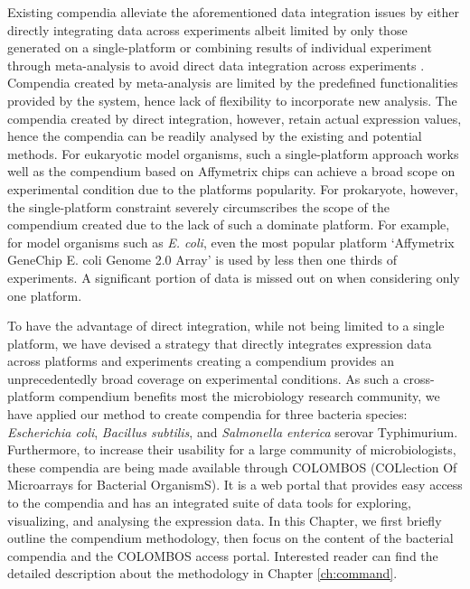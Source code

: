 Existing compendia alleviate the aforementioned data integration issues by 
either directly integrating data across experiments albeit limited by only 
those generated on a single-platform \cite{Faith2008, Hruz2008} 
or combining results of individual experiment through meta-analysis to avoid 
direct data integration across experiments 
\cite{Rhodes2007, Pan2007, Elfilali2006, Kapushesky2010}.
Compendia created by meta-analysis are limited by the predefined  
functionalities provided by the system, hence lack of flexibility to 
incorporate new analysis.
The compendia created by direct integration, however, retain actual expression 
values, hence the compendia can be readily analysed by the existing and 
potential methods.
For eukaryotic model organisms, such a single-platform approach works well 
as the compendium based on Affymetrix chips can achieve a broad scope on 
experimental condition due to the platforms popularity.
For prokaryote, however, the single-platform constraint severely circumscribes 
the scope of the compendium created due to the lack of such a dominate platform.
For example, for model organisms such as {\it E. coli}, even the most popular 
platform `Affymetrix GeneChip E. coli Genome 2.0 Array' is used by less then 
one thirds of experiments. A significant portion of data is missed out on 
when considering only one platform.

To have the advantage of direct integration, while not being limited to a 
single platform, we have devised a strategy that directly integrates expression 
data across platforms and experiments creating a compendium provides an 
unprecedentedly broad coverage on experimental conditions.
As such a cross-platform compendium benefits most the microbiology research 
community, we have applied our method to create compendia for three 
bacteria species: \textit{Escherichia coli}, \textit{Bacillus 
subtilis}, and \textit{Salmonella enterica} serovar Typhimurium.  
Furthermore, to increase their usability for a large community of 
microbiologists, these compendia are being made available through COLOMBOS 
(COLlection Of Microarrays for Bacterial OrganismS). 
It is a web portal that provides easy access to the compendia and has an 
integrated suite of data tools for exploring, visualizing, and analysing the 
expression data.
In this Chapter, we first briefly outline the compendium methodology, then 
focus on the content of the bacterial compendia and the COLOMBOS access portal. 
Interested reader can find the detailed description about the methodology in 
Chapter \ref{ch:command}.



